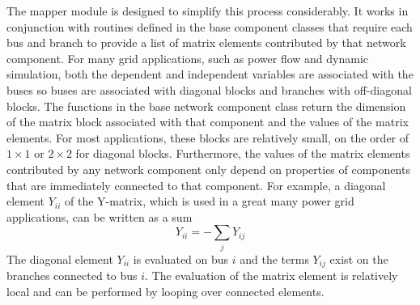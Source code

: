 \documentclass[preprint]{acm_proc_article-sp}
\begin{document}
The mapper module is designed to simplify this process considerably. It works in
conjunction with routines defined in the base component classes that
require each bus and branch to provide a list of matrix elements contributed by
that network component. For many grid applications, such as power flow and dynamic
simulation, both the dependent and independent variables are associated with
the buses so buses are associated with diagonal blocks and branches with
off-diagonal blocks. The functions in the base network component class
return the dimension of the matrix block associated with that component and the
values of the matrix elements. For most applications, these blocks are
relatively small, on the order of $1\times 1$ or $2\times 2$ for diagonal
blocks. Furthermore, the values of the matrix elements contributed by any
network component only depend on properties of components that are immediately
connected to that component. For example, a diagonal element $Y_{ii}$ of the
Y-matrix, which is used in a great many power grid applications,
can be written as a sum
\[
Y_{ii} = -\sum_j Y_{ij}
\]
The diagonal element $Y_{ii}$ is evaluated on bus $i$ and the terms $Y_{ij}$
exist on the branches connected to bus $i$. The evaluation of the matrix element
is relatively local and can be performed by looping over connected elements.
\end{document}
